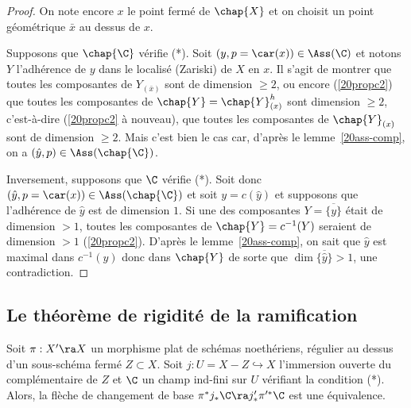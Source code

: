 \documentclass[10pt]{../fichiers-configuration-latex/smfart}
\begin{document}
\begin{proof} On note encore $x$ le point fermé de $\chap{X}$ et on choisit un point géométrique
$\bar x$ au dessus de $x$.

Supposons que $\chap{\C}$ vérifie (*). Soit $(y,p=\car(x))\in\Ass(\C)$ et notons $Y$ l'adhérence de
$y$ dans le localisé (Zariski) de $X$ en $x$. Il s'agit de montrer que toutes les composantes de
$Y_{(\bar x)}$ sont de dimension $\geq 2$, ou encore (\ref{20propc2}) que toutes les composantes de
$\chap{Y}=\chap{Y}_{(x)}^h$ sont dimension $\geq 2$, c'est-à-dire (\ref{20propc2} à nouveau), que
toutes les composantes de $\chap{Y}_{(x)}$ sont de dimension $\geq 2$. Mais c'est bien le cas car,
d'après le lemme~\ref{20ass-comp}, on a $(\hat y,p)\in\Ass(\chap{\C})$.

Inversement, supposons que $\C$ vérifie (*). Soit donc $(\hat y,p=\car(x))\in\Ass(\chap{\C})$ et
soit $y=c(\hat y)$ et supposons que l'adhérence de $\hat y$ est de dimension $1$.  Si une des
composantes  $Y=\overline{\{y\}}$ était de dimension $>1$, toutes les composantes de
$\chap{Y}=c^{-1}(Y)$ seraient de dimension $>1$ (\ref{20propc2}). D'après le lemme~\ref{20ass-comp},
on sait que $\hat y$ est maximal dans $c^{-1}(y)$ donc dans $\chap{Y}$ de sorte que
$\dim\overline{\{\hat y\}}>1$, une contradiction. \end{proof}

\subsection{Le théorème de rigidité de la ramification}

\begin{theoreme2}\label{20rigfort} Soit $\pi:X'\ra X$ un morphisme
plat de schémas noethériens, régulier au dessus d'un sous-schéma fermé $Z\subset X$.  Soit
$j:U=X-Z\hookrightarrow X$ l'immersion ouverte du complémentaire de $Z$ et $\C$ un champ ind-fini
sur $U$ vérifiant la condition (*). Alors, la flèche de changement de base $\pi^*j_*\C\ra
j'_*\pi'^*\C$ est une équivalence.\end{theoreme2}
\end{document}

